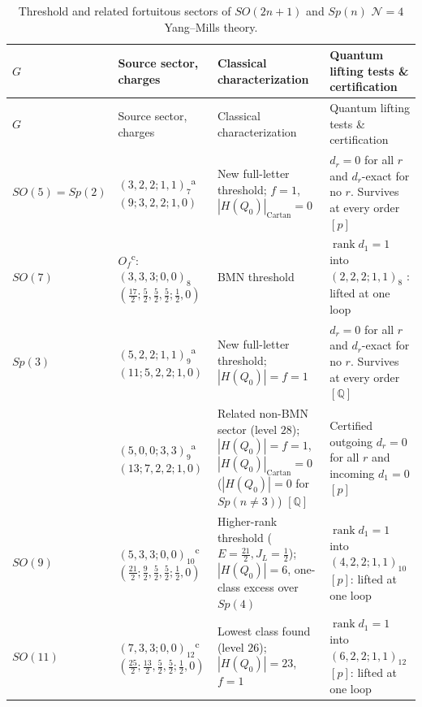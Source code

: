 \documentclass[11pt]{article}
\numberwithin{equation}{section}
\numberwithin{figure}{section}
\numberwithin{table}{section}
\newcommand{\HQ}{|H(Q_0)|}
\newcommand{\HQC}{|H(Q_0)|_{\mathrm{Cartan}}}
\begin{document}
{\footnotesize\renewcommand{\arraystretch}{1.28}\setlength{\tabcolsep}{3.5pt}
\begin{xltabular}{\linewidth}{|l|>{\raggedright\arraybackslash}p{3.55cm}|>{\raggedright\arraybackslash}X|>{\raggedright\arraybackslash}X|}
\caption{Threshold and related fortuitous sectors of $SO(2n+1)$ and $Sp(n)$ $\mathcal N=4$ Yang--Mills theory.}\label{local-ch9-sosp-classes}\\
\hline
$G$ & Source sector, charges & Classical characterization & Quantum lifting tests \& certification\\
\hline\endfirsthead
\hline
$G$ & Source sector, charges & Classical characterization & Quantum lifting tests \& certification\\
\hline\endhead
$SO(5)=Sp(2)$ & $(3,2,2;1,1)_7$\textsuperscript{a}\newline $(9;3,2,2;1,0)$ & New full-letter threshold; $f=1$, $\HQC=0$ & $d_r=0$ for all $r$ and $d_r$-exact for no $r$. Survives at every order $[p]$\\
\hline
$SO(7)$ & $O_f$\textsuperscript{c}: $(3,3,3;0,0)_8$\newline $(\tfrac{17}2;\tfrac52,\tfrac52,\tfrac52;\tfrac12,0)$ & BMN threshold \cite[Section 4.3]{GLRT} & $\operatorname{rank}d_1=1$ into $(2,2,2;1,1)_8$ \cite{KonishiBH}: lifted at one loop\\
\hline
$Sp(3)$ & $(5,2,2;1,1)_9$\textsuperscript{a}\newline $(11;5,2,2;1,0)$ & New full-letter threshold; $\HQ=f=1$ & $d_r=0$ for all $r$ and $d_r$-exact for no $r$. Survives at every order $[\mathbb Q]$ \cite{Repo}\\
 & $(5,0,0;3,3)_9$\textsuperscript{a}\newline $(13;7,2,2;1,0)$ & Related non-BMN sector (level $28$); $\HQ=f=1$, $\HQC=0$ ($\HQ=0$ for $Sp(n\ne3)$) $[\mathbb Q]$ & Certified outgoing $d_r=0$ for all $r$ and incoming $d_1=0$ $[p]$ \cite{Repo}\\
\hline
$SO(9)$ & $(5,3,3;0,0)_{10}$\textsuperscript{c}\newline $(\tfrac{21}2;\tfrac92,\tfrac52,\tfrac52;\tfrac12,0)$ & Higher-rank threshold ($E=\tfrac{21}2,J_L=\tfrac12$); $\HQ=6$, one-class excess over $Sp(4)$ & $\operatorname{rank}d_1=1$ into $(4,2,2;1,1)_{10}$ $[p]$: lifted at one loop\\
\hline
$SO(11)$ & $(7,3,3;0,0)_{12}$\textsuperscript{c}\newline $(\tfrac{25}2;\tfrac{13}2,\tfrac52,\tfrac52;\tfrac12,0)$ & Lowest class found (level $26$); $\HQ=23$, $f=1$ & $\operatorname{rank}d_1=1$ into $(6,2,2;1,1)_{12}$ $[p]$: lifted at one loop\\
\hline
\end{xltabular}}
\end{document}
